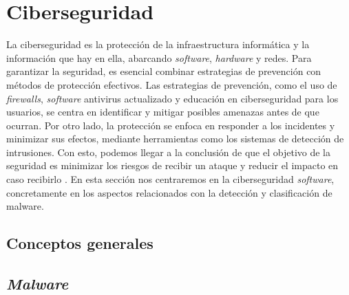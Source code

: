 \subsection{}



\subsubsection{}








\section{Ciberseguridad}
\label{sec:ciberseguridad}

La ciberseguridad es la protección de la infraestructura informática y la información que hay en ella, abarcando \textit{software}, \textit{hardware} y redes. Para garantizar la seguridad, es esencial combinar estrategias de prevención con métodos de protección efectivos. Las estrategias de prevención, como el uso de \textit{firewalls}, \textit{software} antivirus actualizado y educación en ciberseguridad para los usuarios, se centra en identificar y mitigar posibles amenazas antes de que ocurran. Por otro lado, la protección se enfoca en responder a los incidentes y minimizar sus efectos, mediante herramientas como los sistemas de detección de intrusiones. Con esto, podemos llegar a la conclusión de que el objetivo de la seguridad es minimizar los riesgos de recibir un ataque y reducir el impacto en caso recibirlo \cite{ciberseguridad_def}. En esta sección nos centraremos en la ciberseguridad \textit{software}, concretamente en los aspectos relacionados con la detección y clasificación de malware.

\subsection{Conceptos generales}
\label{subsec:ciberseguridad_general}

\subsection{\textit{Malware}}
\label{subsec:malware}


